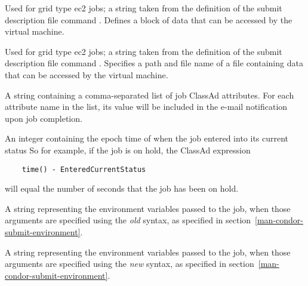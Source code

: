 \begin{description}
\item[\AdAttr{EC2UserData}:] 
Used for grid type ec2 jobs;
a string taken from the definition of the submit description file command
.
Defines a block of data that can be accessed by the virtual machine.

\item[\AdAttr{EC2UserDataFile}:] 
Used for grid type ec2 jobs;
a string taken from the definition of the submit description file command
.
Specifies a path and file name of a file containing 
data that can be accessed by the virtual machine.

\item[\AdAttr{EmailAttributes}:]  A string containing a comma-separated
list of job ClassAd attributes. For each attribute name in the list,
its value will be included in the e-mail notification upon job completion.

\item[\AdAttr{EnteredCurrentStatus}:]  An integer containing the
epoch time of when the job entered into its current status
So for example, if the job is on hold, the ClassAd expression
\begin{verbatim}
    time() - EnteredCurrentStatus
\end{verbatim}
will equal the number of seconds that the job has been on hold.

\item[\AdAttr{Args}:]  A string representing the environment variables 
passed to the job, when those arguments are specified using the
\emph{old} syntax, as specified in section~\ref{man-condor-submit-environment}.

\item[\AdAttr{Arguments}:]  A string representing the environment variables
passed to the job, when those arguments are specified using the
\emph{new} syntax, as specified in section~\ref{man-condor-submit-environment}.


\end{description}
